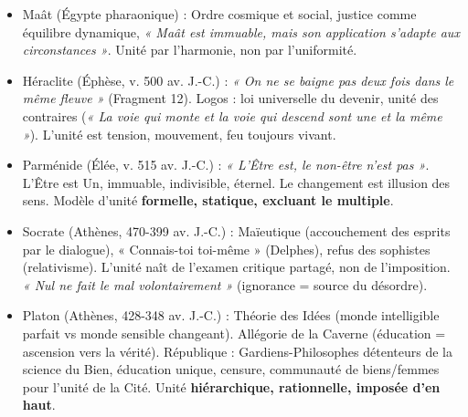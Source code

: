 \documentclass[11pt]{article}
\newcommand{\cle}[1]{{\popxbold\color{popdark}#1}}
\newcounter{popsec}
\newcounter{popsub}
\newcommand{\courssub}[1]{%
  \stepcounter{popsub}%
  \par\vspace{9pt}\noindent{\popxbold\fontsize{11.5}{13}\selectfont\color{popink}{\color{poporange}\thepopsec.\thepopsub}\hspace{6pt}#1}\par\nopagebreak\vspace{4pt}
}
\begin{document}
\courssub{Ressources à mobiliser}
\begin{itemize}
    \item \cle{Maât (Égypte pharaonique)} : Ordre cosmique et social, justice comme équilibre dynamique, \emph{« Maât est immuable, mais son application s'adapte aux circonstances »}. Unité par l'harmonie, non par l'uniformité.
    \item \cle{Héraclite (Éphèse, v. 500 av. J.-C.)} : \emph{« On ne se baigne pas deux fois dans le même fleuve »} (Fragment 12). \cle{Logos} : loi universelle du devenir, unité des contraires (\emph{« La voie qui monte et la voie qui descend sont une et la même »}). L'unité est tension, mouvement, feu toujours vivant.
    \item \cle{Parménide (Élée, v. 515 av. J.-C.)} : \emph{« L'Être est, le non-être n'est pas »}. L'Être est Un, immuable, indivisible, éternel. Le changement est illusion des sens. Modèle d'unité \textbf{formelle, statique, excluant le multiple}.
    \item \cle{Socrate (Athènes, 470-399 av. J.-C.)} : \cle{Maïeutique} (accouchement des esprits par le dialogue), \cle{« Connais-toi toi-même »} (Delphes), refus des sophistes (relativisme). L'unité naît de l'examen critique partagé, non de l'imposition. \emph{« Nul ne fait le mal volontairement »} (ignorance = source du désordre).
    \item \cle{Platon (Athènes, 428-348 av. J.-C.)} : \cle{Théorie des Idées} (monde intelligible parfait vs monde sensible changeant). \cle{Allégorie de la Caverne} (éducation = ascension vers la vérité). \cle{République} : Gardiens-Philosophes détenteurs de la science du Bien, éducation unique, censure, communauté de biens/femmes pour l'unité de la Cité. Unité \textbf{hiérarchique, rationnelle, imposée d'en haut}.
\end{itemize}
\end{document}
